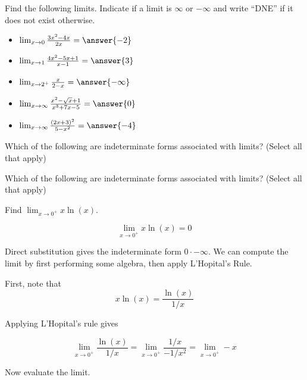 \documentclass{ximera}
\author{Jim Talamo}
\begin{document}
\begin{exercise}

Find the following limits.  Indicate if a limit is $\infty$ or $-\infty$ and write ``DNE'' if it does not exist otherwise.

\begin{itemize}
\item $\lim_{x \to 0} \frac{3x^2-4x}{2x} = \answer{-2}$
\item $\lim_{x \to 1} \frac{4x^2-5x+1}{x-1} = \answer{3}$
\item $\lim_{x \to 2^+} \frac{x}{2-x} = \answer{-\infty}$
\item $\lim_{x \to \infty} \frac{x^2-\sqrt{x}+1}{x^3+7x-5} = \answer{0}$
\item $\lim_{x \to \infty} \frac{(2x+3)^2}{5-x^2} = \answer{-4}$
\end{itemize}

\end{exercise}

\begin{exercise}
Which of the following are indeterminate forms associated with limits? (Select all that apply)

\begin{selectAll}
\choice[correct]{$\frac{\infty}{\infty}$}
\end{selectAll}
\end{exercise}

\begin{exercise}
Which of the following are indeterminate forms associated with limits? (Select all that apply)

\begin{selectAll}
\choice{$\infty^{\infty}$}
\end{selectAll}
\end{exercise}

\begin{exercise}
Find $\lim_{x \to 0^+} x \ln(x)$.

\[
\lim_{x \to 0^+} x \ln(x) = 0
\]

\begin{hint}
Direct substitution gives the indeterminate form $0 \cdot -\infty$.  We can compute the limit by first performing some algebra, then apply L'Hopital's Rule.

First, note that 
\[
x \ln(x) = \frac{\ln(x)}{1/x}
\]

Applying L'Hopital's rule gives

\[
\lim_{x \to 0^+} \frac{\ln(x)}{1/x} = \lim_{x \to 0^+} \frac{1/x}{-1/x^2} = \lim_{x \to 0^+} -x
\]

Now evaluate the limit.

\end{hint}
\end{exercise}
\end{document}
